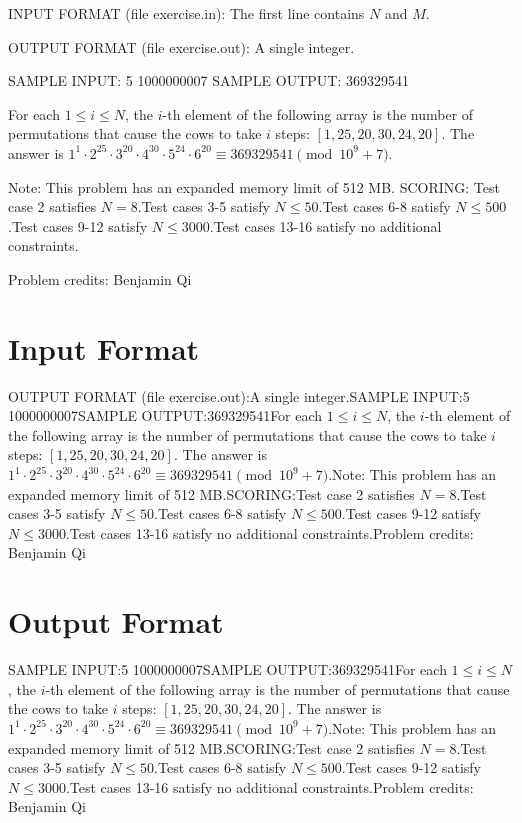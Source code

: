 \documentclass[12pt]{article}
\begin{document}
INPUT FORMAT (file exercise.in):
The first line contains $N$ and $M$.

OUTPUT FORMAT (file exercise.out):
A single integer.

SAMPLE INPUT:
5 1000000007
SAMPLE OUTPUT: 
369329541

For each $1\le i\le N$, the $i$-th element of the following array is the number
of  permutations that cause the cows to take $i$ steps: $[1,25,20,30,24,20].$
The answer  is
$1^1\cdot 2^{25}\cdot 3^{20}\cdot 4^{30}\cdot 5^{24}\cdot 6^{20}\equiv 369329541\pmod{10^9+7}$.

Note: This problem has an expanded memory limit of 512 MB.
SCORING:
Test case 2 satisfies $N=8$.Test cases 3-5 satisfy $N\le 50$.Test cases 6-8 satisfy $N\le 500$.Test cases 9-12 satisfy $N\le 3000$.Test cases 13-16 satisfy no additional constraints.


Problem credits: Benjamin Qi



\section*{Input Format}
OUTPUT FORMAT (file exercise.out):A single integer.SAMPLE INPUT:5 1000000007SAMPLE OUTPUT:369329541For each $1\le i\le N$, the $i$-th element of the following array is the number
of  permutations that cause the cows to take $i$ steps: $[1,25,20,30,24,20].$
The answer  is
$1^1\cdot 2^{25}\cdot 3^{20}\cdot 4^{30}\cdot 5^{24}\cdot 6^{20}\equiv 369329541\pmod{10^9+7}$.Note: This problem has an expanded memory limit of 512 MB.SCORING:Test case 2 satisfies $N=8$.Test cases 3-5 satisfy $N\le 50$.Test cases 6-8 satisfy $N\le 500$.Test cases 9-12 satisfy $N\le 3000$.Test cases 13-16 satisfy no additional constraints.Problem credits: Benjamin Qi

\section*{Output Format}
SAMPLE INPUT:5 1000000007SAMPLE OUTPUT:369329541For each $1\le i\le N$, the $i$-th element of the following array is the number
of  permutations that cause the cows to take $i$ steps: $[1,25,20,30,24,20].$
The answer  is
$1^1\cdot 2^{25}\cdot 3^{20}\cdot 4^{30}\cdot 5^{24}\cdot 6^{20}\equiv 369329541\pmod{10^9+7}$.Note: This problem has an expanded memory limit of 512 MB.SCORING:Test case 2 satisfies $N=8$.Test cases 3-5 satisfy $N\le 50$.Test cases 6-8 satisfy $N\le 500$.Test cases 9-12 satisfy $N\le 3000$.Test cases 13-16 satisfy no additional constraints.Problem credits: Benjamin Qi
\end{document}
